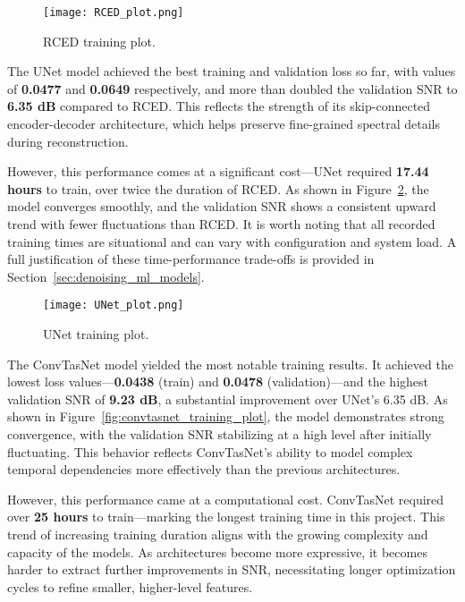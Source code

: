 \begin{figure}[H]
    \centering
    \texttt{[image: RCED\_plot.png]}
    \caption{\label{fig:rced_training_plot} RCED training plot.}
\end{figure}

The UNet model achieved the best training and validation loss so far, with values of \textbf{0.0477} and \textbf{0.0649} respectively, and more than doubled the validation SNR to \textbf{6.35 dB} compared to RCED. This reflects the strength of its skip-connected encoder-decoder architecture, which helps preserve fine-grained spectral details during reconstruction.

However, this performance comes at a significant cost—UNet required \textbf{17.44 hours} to train, over twice the duration of RCED. As shown in Figure~\ref{fig:unet_training_plot}, the model converges smoothly, and the validation SNR shows a consistent upward trend with fewer fluctuations than RCED. It is worth noting that all recorded training times are situational and can vary with configuration and system load. A full justification of these time-performance trade-offs is provided in Section~\ref{sec:denoising_ml_models}.

\begin{figure}[H]
    \centering
    \texttt{[image: UNet\_plot.png]}
    \caption{\label{fig:unet_training_plot} UNet training plot.}
\end{figure}

The ConvTasNet model yielded the most notable training results. It achieved the lowest loss values—\textbf{0.0438} (train) and \textbf{0.0478} (validation)—and the highest validation SNR of \textbf{9.23 dB}, a substantial improvement over UNet’s 6.35 dB. As shown in Figure~\ref{fig:convtasnet_training_plot}, the model demonstrates strong convergence, with the validation SNR stabilizing at a high level after initially fluctuating. This behavior reflects ConvTasNet’s ability to model complex temporal dependencies more effectively than the previous architectures.

However, this performance came at a computational cost. ConvTasNet required over \textbf{25 hours} to train—marking the longest training time in this project. This trend of increasing training duration aligns with the growing complexity and capacity of the models. As architectures become more expressive, it becomes harder to extract further improvements in SNR, necessitating longer optimization cycles to refine smaller, higher-level features.

